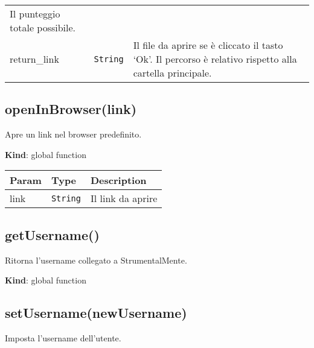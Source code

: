 \begin{tabularx}{\textwidth}{XXX}
\begin{minipage}[t]{0.30\columnwidth}
Il punteggio totale possibile.\strut
\end{minipage}\tabularnewline
\begin{minipage}[t]{0.30\columnwidth}\raggedright
return\_link\strut
\end{minipage} & \begin{minipage}[t]{0.30\columnwidth}\raggedright
\texttt{String}\strut
\end{minipage} & \begin{minipage}[t]{0.30\columnwidth}\raggedright
Il file da aprire se è cliccato il tasto `Ok'. Il percorso è relativo
rispetto alla cartella principale.\strut
\end{minipage}\tabularnewline
\bottomrule
\end{tabularx}

\protect\hypertarget{openInBrowser}{}{}

\hypertarget{openinbrowserlink}{%
\subsection{openInBrowser(link)}\label{openinbrowserlink}}

Apre un link nel browser predefinito.

\textbf{Kind}: global function

\begin{tabularx}{\textwidth}{XXX}
\toprule
Param & Type & Description\tabularnewline
\midrule
\endhead
link & \texttt{String} & Il link da aprire\tabularnewline
\bottomrule
\end{tabularx}

\protect\hypertarget{getUsername}{}{}

\hypertarget{getusername}{%
\subsection{getUsername()}\label{getusername}}

Ritorna l'username collegato a StrumentalMente.

\textbf{Kind}: global function\\
\protect\hypertarget{setUsername}{}{}

\hypertarget{setusernamenewusername}{%
\subsection{setUsername(newUsername)}\label{setusernamenewusername}}

Imposta l'username dell'utente.

